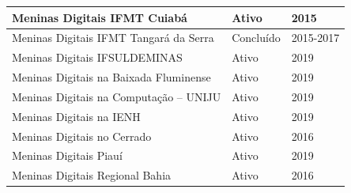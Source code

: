 \begin{longtable}{|l|l|l|}
Meninas Digitais IFMT Cuiabá                                                                                                                                & Ativo                        & 2015                        \\ \hline
Meninas Digitais IFMT Tangará da Serra                                                                                                                      & Concluído                    & 2015-2017                   \\ \hline
Meninas Digitais IFSULDEMINAS                                                                                                                               & Ativo                        & 2019                        \\ \hline
  
Meninas Digitais na Baixada Fluminense                                                                                                                      & Ativo                        & 2019                        \\ \hline
  
Meninas Digitais na Computação – UNIJU                                                                                                                      & Ativo                        & 2019                        \\ \hline
  
Meninas Digitais na IENH                                                                                                                                    & Ativo                        & 2019                        \\ \hline
  
Meninas Digitais no Cerrado                                                                                                                                 & Ativo                        & 2016                        \\ \hline
Meninas Digitais Piauí                                                                                                                                      & Ativo                        & 2019                        \\ \hline
  
Meninas Digitais Regional Bahia                                                                                                                             & Ativo                        & 2016                        \\ \hline
  

\end{longtable}
